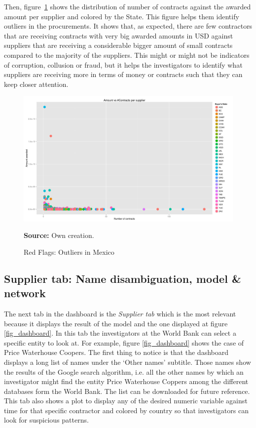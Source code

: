 Then, figure \ref{fig_mex-amount} shows the distribution of number of contracts against the awarded amount per supplier and colored by the State. This figure helps them identify outliers in the procurements. It shows that, as expected, there are few contractors that are receiving contracts with very big awarded amounts in USD against suppliers that are receiving a considerable bigger amount of small contracts compared to the majority of the suppliers. This might or might not be indicators of corruption, collusion or fraud, but it helps the investigators to identify what suppliers are receiving more in terms of money or contracts such that they can keep closer attention.


\begin{figure}[H]
\begin{center}
\caption{Red Flags: Outliers in Mexico}
\label{fig_mex-amount}
\includegraphics[width=1.05\textwidth,keepaspectratio]{../img/mex-amount-contract.pdf}
\end{center}
\noindent \footnotesize{\textbf{Source:} Own creation.}
\end{figure}

\subsection{Supplier tab: Name disambiguation, model \& network}

The next tab in the dashboard is the \textit{Supplier tab} which is the most relevant because it displays the result of the model and the one displayed at figure \ref{fig_dashboard}. In this tab the investigators at the World Bank can select a specific entity to look at. For example, figure \ref{fig_dashboard} shows the case of Price Waterhouse Coopers. The first thing to notice is that the dashboard displays a long list of names under the `Other names' subtitle. Those names show the results of the Google search algorithm, i.e. all the other names by which an investigator might find the entity Price Waterhouse Coppers among the different databases form the World Bank. The list can be downloaded for future reference. This tab also shows a plot to display any of the desired numeric variable against time  for that specific contractor and colored by country so that investigators can look for suspicious patterns.

